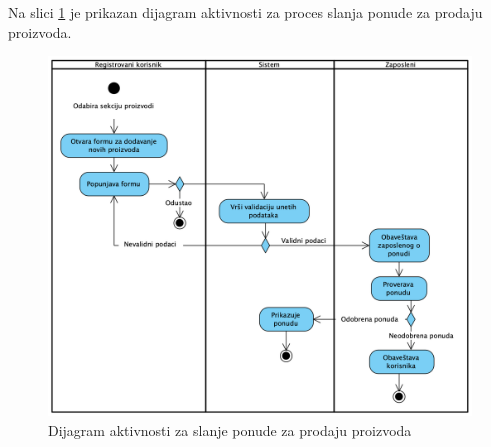\documentclass[a4paper, oneside]{article}
\begin{document}
Na slici \ref{dakt_slanje_ponude_za_prodaju} je prikazan dijagram aktivnosti za proces slanja ponude za prodaju proizvoda.
\begin{figure}[h!]
    \centering
    \includegraphics[scale=0.5]{images/dakt_slanje_ponude_za_prodaju.png}
    \caption{Dijagram aktivnosti za slanje ponude za prodaju proizvoda}
    \label{dakt_slanje_ponude_za_prodaju}
\end{figure}
\end{document}
